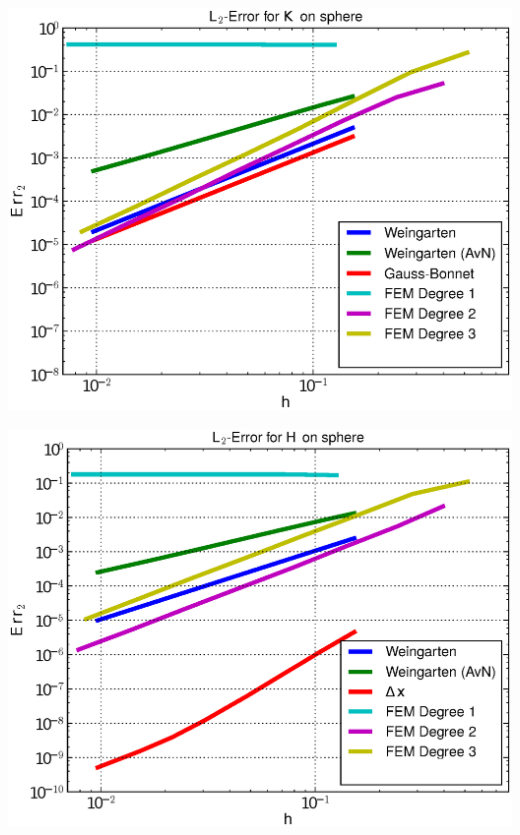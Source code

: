 \documentclass{beamer}
\begin{document}
\begin{frame}
\begin{overprint}
\begin{minipage}[t]{0.49\textwidth}
            \centering\includegraphics[width=\textwidth]{bilder/Curvature/sphere/ErrKL2_6.eps}
          \end{minipage}\hfill
          \begin{minipage}[t]{0.49\textwidth}
            \centering\includegraphics[width=\textwidth]{bilder/Curvature/sphere/ErrHL2_6.eps}
          \end{minipage}
          \begin{minipage}[t]{0.49\textwidth}

\end{minipage}
\end{overprint}
\end{frame}
\end{document}
